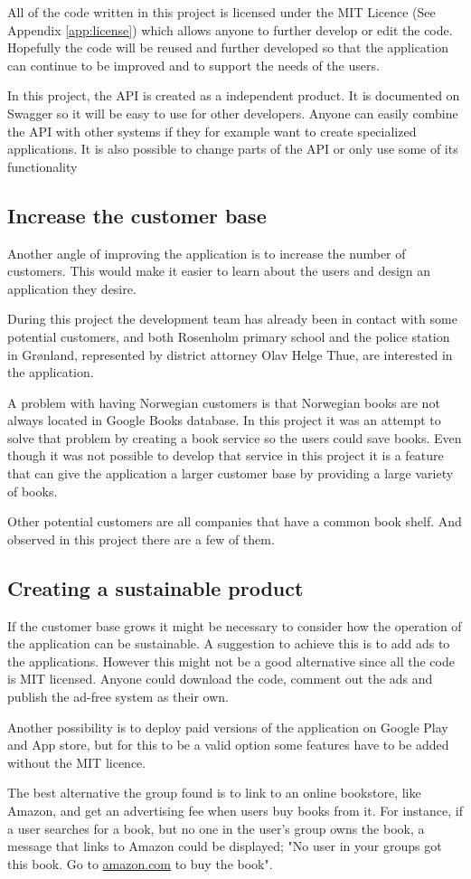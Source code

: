 All of the code written in this project is licensed under the MIT Licence (See Appendix \ref{app:license}) which  allows anyone to further develop or edit the code.  Hopefully the code will be reused and further developed so that the application can continue to be improved and to support the needs of the users.

In this project, the \gls{API} is created as a independent product. It is documented on Swagger so it will be easy to use for other developers. Anyone can easily combine the \gls{API}  with other systems if they for example want to create specialized applications. It is also possible to change parts of the \gls{API} or only use some of its functionality

\subsection{Increase the customer base}
Another angle of improving the application is to increase the number of customers. This would make it easier to learn about the users and design an application they desire. 

During this project the development team has already been in contact with some potential customers, and both Rosenholm primary school and the police station in Grønland, represented by district attorney Olav Helge Thue, are interested in the application.

A problem with having Norwegian customers is that Norwegian books are not always located in Google Books database. In this project it was an attempt to solve that problem by creating a book service so the users could save books. Even though it was not possible to develop that service in this project it is a feature that can give the application a larger customer base by providing a large variety of books.

Other potential customers are all companies that have a common book shelf. And observed in this project there are a few of them. 

\subsection{Creating a sustainable product}
If the customer base grows it might be necessary to consider how the operation of the application can be sustainable.
A suggestion to achieve this is to add ads to the applications. However this might not be a good alternative since all the code is MIT licensed. Anyone could  download the code, comment out the ads and publish the ad-free system as their own. 

Another possibility is to deploy paid versions of the application on Google Play and App store, but for this to be a valid option some features have to be added without the MIT licence.

The best alternative the group found is to link to an online bookstore, like Amazon, and get an advertising fee when users buy books from it. For instance, if a user searches for a book, but no one in the user's group owns the book, a message that links to Amazon could be displayed; "No user in your groups got this book. Go to \url{amazon.com} to buy the book".

